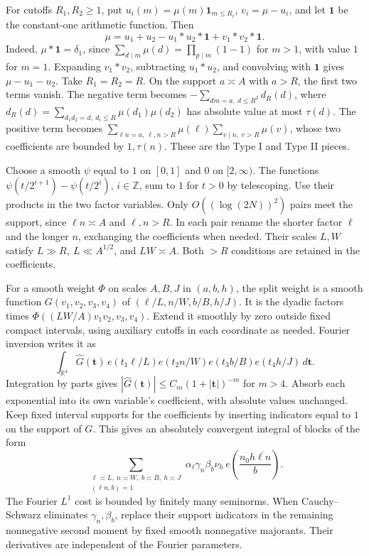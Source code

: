 \documentclass[11pt]{amsart}
\numberwithin{equation}{section}
\theoremstyle{remark}
\begin{document}
For cutoffs \(R_1,R_2\ge1\), put \(u_i(m)=\mu(m)\mathbf1_{m\le R_i}\), \(v_i=\mu-u_i\), and let \(\mathbf1\) be the constant-one arithmetic function. Then
\begin{equation}\label{eq:mobius}
 \mu=u_1+u_2-u_1*u_2*\mathbf1+v_1*v_2*\mathbf1 .
\end{equation}
Indeed, \(\mu*\mathbf1=\delta_1\), since
\(\sum_{d\mid m}\mu(d)=\prod_{p\mid m}(1-1)\) for \(m>1\), with value
\(1\) for \(m=1\). Expanding \(v_1*v_2\), subtracting \(u_1*u_2\), and convolving
with \(\mathbf1\) gives \(\mu-u_1-u_2\). Take \(R_1=R_2=R\).
On the support \(a\asymp A\) with \(a>R\), the first two terms vanish. The
negative term becomes \(-\sum_{dm=a,\ d\le R^2}d_R(d)\), where
\(d_R(d)=\sum_{d_1d_2=d,\ d_i\le R}\mu(d_1)\mu(d_2)\) has absolute value
at most \(\tau(d)\). The positive term becomes
\(\sum_{\ell n=a,\ \ell,n>R}\mu(\ell)\sum_{v\mid n,\ v>R}\mu(v)\),
whose two coefficients are bounded by \(1,\tau(n)\).
These are the Type I and Type II pieces.

Choose a smooth \(\psi\) equal to \(1\) on \([0,1]\) and \(0\) on
\([2,\infty)\). The functions
\(\psi(t/2^{i+1})-\psi(t/2^i)\), \(i\in\mathbb Z\), sum to \(1\) for
\(t>0\) by telescoping. Use their products in the two factor variables.
Only \(O((\log(2N))^2)\) pairs meet the support, since
\(\ell n\asymp A\) and \(\ell,n>R\). In each pair rename the shorter
factor \(\ell\) and the longer \(n\), exchanging the coefficients when
needed. Their scales \(L,W\) satisfy \(L\gg R,\ L\ll A^{1/2}\), and
\(LW\asymp A\). Both \(>R\) conditions are retained in the coefficients.

For a smooth weight \(\Phi\) on scales \(A,B,J\) in \((a,b,h)\), the
split weight is a smooth function \(G(v_1,v_2,v_3,v_4)\) of
\((\ell/L,n/W,b/B,h/J)\). It is the dyadic factors times
\(\Phi((LW/A)v_1v_2,v_3,v_4)\). Extend it smoothly by zero outside fixed
compact intervals, using auxiliary cutoffs in each coordinate as needed.
Fourier inversion writes it as
\[
 \int_{\mathbb R^4}\widehat G(\mathbf t)\,
 e(t_1\ell/L)e(t_2 n/W)e(t_3 b/B)e(t_4 h/J)\,d\mathbf t .
\]
Integration by parts gives
\(|\widehat G(\mathbf t)|\le C_m(1+|\mathbf t|)^{-m}\) for \(m>4\).
Absorb each exponential into its own variable's coefficient, with
absolute values unchanged. Keep fixed interval supports for the
coefficients by inserting indicators equal to \(1\) on the support of
\(G\). This gives an absolutely convergent integral of blocks of the form
\begin{equation}\label{eq:separated}
 \sum_{\substack{\ell\asymp L,\ n\asymp W,\ b\asymp B,\ h\asymp J\\
                  (\ell n,b)=1}}
 \alpha_\ell\gamma_n\beta_b\nu_h\,e\!\left(\frac{n_0h\overline{\ell n}}b\right).
\end{equation}
The Fourier \(L^1\) cost is bounded by finitely many seminorms. When
Cauchy--Schwarz eliminates \(\gamma_n,\beta_b\), replace their support
indicators in the remaining nonnegative second moment by fixed smooth
nonnegative majorants. Their derivatives are independent of the
Fourier parameters.
\end{document}

